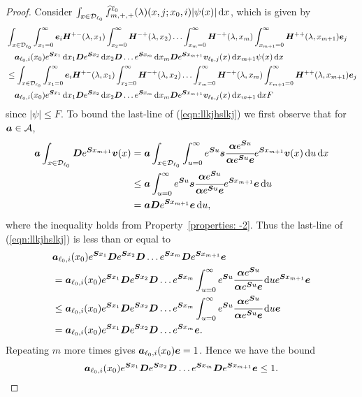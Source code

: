 \begin{proof}
	Consider \(\int_{x\in\mathcal{D}_{\ell_0}}\widehat f^{\ell_0}_{m,+,+}(\lambda)(x,j;x_0,i)|\psi(x)|\, \mathrm{d} x\), which is given by 
        \begin{align}
        	&\int_{x\in\mathcal{D}_{\ell_0}}\int_{x_1=0}^\infty\boldsymbol e_i \boldsymbol H^{+-}(\lambda,x_1)\nonumber
	\int_{x_2=0}^\infty \boldsymbol H^{-+}(\lambda,x_2) 
	\hdots \int_{x_m=0}^\infty \boldsymbol H^{-+}(\lambda, x_m) 
	\int_{x_{m+1}=0}^\infty \boldsymbol H^{++}(\lambda,x_{m+1}) \boldsymbol e_j
	\\&\quad\boldsymbol   a_{\ell_0,i}(x_0)e^{\boldsymbol{S}x_1}\, \mathrm{d} x_1 \boldsymbol{D}e^{\boldsymbol{S}x_2} \, \mathrm{d} x_2 \boldsymbol{D}\dots e^{\boldsymbol{S}x_m} \, \mathrm{d} x_m \boldsymbol{D}e^{\boldsymbol{S}x_{m+1}}{\boldsymbol v}_{\ell_0,j}( x) \, \mathrm{d} x_{m+1}\psi(x)\, \mathrm{d} x\nonumber
			\\&\leq \int_{x\in\mathcal{D}_{\ell_0}}\int_{x_1=0}^\infty \boldsymbol e_i \boldsymbol H^{+-}(\lambda,x_1)\nonumber
			\int_{x_2=0}^\infty \boldsymbol H^{-+}(\lambda,x_2) 
			\hdots \int_{x_m=0}^\infty \boldsymbol H^{-+}(\lambda, x_m) 
			\int_{x_{m+1}=0}^\infty \boldsymbol H^{++}(\lambda,x_{m+1}) \boldsymbol e_j
			\\&\quad\boldsymbol   a_{\ell_0,i}(x_0)e^{\boldsymbol{S}x_1}\, \mathrm{d} x_1 \boldsymbol{D}e^{\boldsymbol{S}x_2} \, \mathrm{d} x_2 \boldsymbol{D}\dots e^{\boldsymbol{S}x_m} \, \mathrm{d} x_m \boldsymbol{D}e^{\boldsymbol{S}x_{m+1}}{\boldsymbol v}_{\ell_0,j}( x) \, \mathrm{d} x_{m+1}\, \mathrm{d} x F 
			\label{eqn:llkjhslkj}
	\end{align}
	since \(|\psi|\leq F\). To bound the last-line of (\ref{eqn:llkjhslkj}) we first observe that for \(\boldsymbol a \in \mathcal A\), 
	\begin{align*}
		\boldsymbol a\int_{x\in\mathcal{D}_{\ell_0}}\boldsymbol De^{\boldsymbol Sx_{m+1}}{\boldsymbol v}(x) 
		&= \boldsymbol a\int_{x\in\mathcal{D}_{\ell_0}}\int_{u=0}^\infty e^{\boldsymbol Su}\boldsymbol s\cfrac{\boldsymbol \alpha e^{\boldsymbol S u}}{\boldsymbol \alpha e^{\boldsymbol S u}\boldsymbol e}e^{\boldsymbol Sx_{m+1}}{\boldsymbol v}(x)\, \mathrm{d} u\, \mathrm{d} x
		\\&\leq \boldsymbol a\int_{u=0}^\infty e^{\boldsymbol Su}\boldsymbol s\cfrac{\boldsymbol \alpha e^{\boldsymbol S u}}{\boldsymbol \alpha e^{\boldsymbol S u}\boldsymbol e}e^{\boldsymbol Sx_{m+1}}{\boldsymbol e}\, \mathrm{d} u
		\\&= \boldsymbol a\boldsymbol D e^{\boldsymbol Sx_{m+1}}{\boldsymbol e}\, \mathrm{d} u,
	\end{align*}
	where the inequality holds from Property~\ref{properties: -2}. Thus the last-line of (\ref{eqn:llkjhslkj}) is less than or equal to
	\begin{align*}
		&\boldsymbol a_{\ell_0,i}(x_0)e^{\boldsymbol{S}x_1} \boldsymbol{D}e^{\boldsymbol{S}x_2} \boldsymbol{D}\dots e^{\boldsymbol{S}x_m} \boldsymbol{D}e^{\boldsymbol{S}x_{m+1}}{\boldsymbol e}
		\\& = \boldsymbol a_{\ell_0,i}(x_0)e^{\boldsymbol{S}x_1} \boldsymbol{D}e^{\boldsymbol{S}x_2} \boldsymbol{D}\dots e^{\boldsymbol{S}x_m} \int_{u=0}^\infty e^{\boldsymbol Su}\cfrac{\boldsymbol \alpha e^{\boldsymbol Su}}{\boldsymbol \alpha e^{\boldsymbol Su}\boldsymbol e}\, \mathrm{d} u e^{\boldsymbol{S}x_{m+1}}{\boldsymbol e}
		\\&\leq \boldsymbol a_{\ell_0,i}(x_0)e^{\boldsymbol{S}x_1} \boldsymbol{D}e^{\boldsymbol{S}x_2} \boldsymbol{D}\dots e^{\boldsymbol{S}x_m} \int_{u=0}^\infty e^{\boldsymbol Su}\cfrac{\boldsymbol \alpha e^{\boldsymbol Su}}{\boldsymbol \alpha e^{\boldsymbol Su}\boldsymbol e}\, \mathrm{d} u {\boldsymbol e}
		\\&=\boldsymbol a_{\ell_0,i}(x_0)e^{\boldsymbol{S}x_1} \boldsymbol{D}e^{\boldsymbol{S}x_2} \boldsymbol{D}\dots e^{\boldsymbol{S}x_m} \boldsymbol e.
	\end{align*}
	Repeating \(m\) more times gives \(\boldsymbol a_{\ell_0,i}(x_0)\boldsymbol e=1\). Hence we have the bound 
	\[\boldsymbol a_{\ell_0,i}(x_0)e^{\boldsymbol{S}x_1} \boldsymbol{D}e^{\boldsymbol{S}x_2} \boldsymbol{D}\dots e^{\boldsymbol{S}x_m} \boldsymbol{D}e^{\boldsymbol{S}x_{m+1}}{\boldsymbol e}\leq 1.\]


\end{proof}
